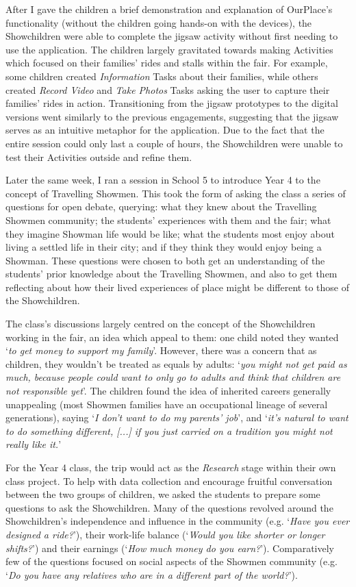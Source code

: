 After I gave the children a brief demonstration and explanation of OurPlace's functionality (without the children going hands-on with the devices), the Showchildren were able to complete the jigsaw activity without first needing to use the application. The children largely gravitated towards making Activities which focused on their families' rides and stalls within the fair. For example, some children created \textit{Information} Tasks about their families, while others created \textit{Record Video} and \textit{Take Photos} Tasks asking the user to capture their families' rides in action. Transitioning from the jigsaw prototypes to the digital versions went similarly to the previous engagements, suggesting that the jigsaw serves as an intuitive metaphor for the application. Due to the fact that the entire session could only last a couple of hours, the Showchildren were unable to test their Activities outside and refine them.

Later the same week, I ran a session in School 5 to introduce Year 4 to the concept of Travelling Showmen. This took the form of asking the class a series of questions for open debate, querying: what they knew about the Travelling Showmen community; the students' experiences with them and the fair; what they imagine Showman life would be like; what the students most enjoy about living a settled life in their city; and if they think they would enjoy being a Showman. These questions were chosen to both get an understanding of the students' prior knowledge about the Travelling Showmen, and also to get them reflecting about how their lived experiences of place might be different to those of the Showchildren.

The class's discussions largely centred on the concept of the Showchildren working in the fair, an idea which appeal to them: one child noted they wanted `\textit{to get money to support my family}'. However, there was a concern that as children, they wouldn't be treated as equals by adults: `\textit{you might not get paid as much, because people could want to only go to adults and think that children are not responsible yet}'. The children found the idea of inherited careers generally unappealing (most Showmen families have an occupational lineage of several generations), saying `\textit{I don't want to do my parents' job}', and `\textit{it's natural to want to do something different, [...] if you just carried on a tradition you might not really like it.}' 

For the Year 4 class, the trip would act as the \textit{Research} stage within their own class project. To help with data collection and encourage fruitful conversation between the two groups of children, we asked the students to prepare some questions to ask the Showchildren. Many of the questions revolved around the Showchildren's independence and influence in the community (e.g. `\textit{Have you ever designed a ride?}'), their work-life balance (`\textit{Would you like shorter or longer shifts?}') and their earnings (`\textit{How much money do you earn?}'). Comparatively few of the questions focused on social aspects of the Showmen community (e.g. `\textit{Do you have any relatives who are in a different part of the world?}').

